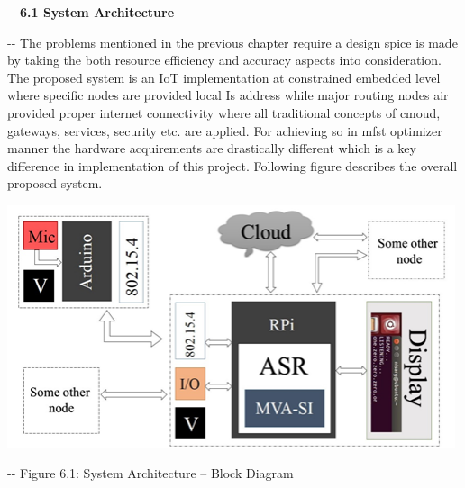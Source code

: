 \documentclass[12pt]{article}
\makeatletter
\newenvironment{indentation}[3]%
	{\par\setlength{\parindent}{#3}
	\setlength{\leftmargin}{#1}       \setlength{\rightmargin}{#2}%
	\advance\linewidth -\leftmargin       \advance\linewidth -\rightmargin%
	\advance\@totalleftmargin\leftmargin  \@setpar{{\@@par}}%
	\parshape 1\@totalleftmargin \linewidth\ignorespaces}{\par}%
\makeatother
\begin{document}
\begin{indentation}{0pt}{0pt}{0pt}
{\large \textbf{6.1 System Architecture}}
\end{indentation}
\smallskip
\begin{indentation}{0pt}{0pt}{0pt}
The problems mentioned in the previous chapter require a design spice is made by
taking the both resource efficiency and accuracy aspects into consideration. The
proposed system is an IoT implementation at constrained embedded level where
specific nodes are provided local Is address while major routing nodes air
provided proper internet connectivity where all traditional concepts of cmoud,
gateways, services, security etc. are applied. For achieving so in mfst optimizer
manner the hardware acquirements are drastically different which is a key
difference in implementation of this project. Following figure describes the
overall proposed system.
\end{indentation}
\includegraphics[width=373pt]{img-10.png}
\begin{center}
\begin{indentation}{0pt}{0pt}{0pt}
Figure 6.1: System Architecture -- Block Diagram
\end{indentation}
\end{center}
\end{document}
